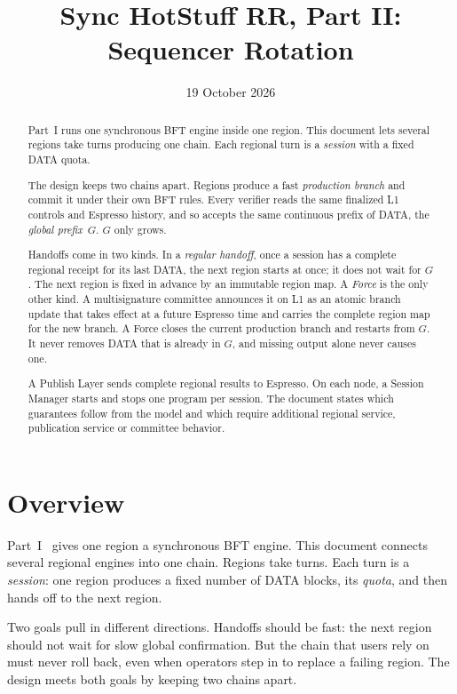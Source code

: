 \documentclass[11pt,a4paper]{article}
\title{Sync HotStuff RR, Part II: Sequencer Rotation}
\author{}\date{19 October 2026}
\newcommand{\defterm}[1]{\textcolor{rrBlue}{\textit{#1}}}
\begin{document}
\maketitle
\begin{abstract}
Part~I runs one synchronous BFT engine inside one region. This document
lets several regions take turns producing one chain. Each regional turn
is a \emph{session} with a fixed DATA quota.

The design keeps two chains apart. Regions produce a fast
\emph{production branch} and commit it under their own BFT rules.
Every verifier reads
the same finalized L1 controls and Espresso history, and so accepts the
same continuous prefix of DATA, the \emph{global prefix}~$G$. $G$ only
grows.

Handoffs come in two kinds. In a \emph{regular handoff}, once a session
has a complete regional receipt for its last DATA, the next region starts
at once; it does not wait for $G$. The next region is fixed in advance by
an immutable region map. A \emph{Force} is the only other kind. A
multisignature committee announces it on L1 as an atomic branch update
that takes effect at a future Espresso time and carries the complete
region map for the new branch. A Force closes the current production
branch and restarts from $G$. It never removes DATA that is already in
$G$, and missing output alone never causes one.

A Publish Layer sends complete regional results to Espresso. On each
node, a Session Manager starts and stops one program per session. The
document states which guarantees follow from the model and which
require additional regional service, publication service or committee
behavior.
\end{abstract}

\section{Overview}
\label{sec:overview}
Part~I~\cite{part1} gives one region a synchronous BFT engine.
This document connects several regional engines into one chain. Regions
take turns. Each turn is a \defterm{session}: one region produces a fixed
number of DATA blocks, its \emph{quota}, and then hands off to the next
region.

Two goals pull in different directions. Handoffs should be fast: the next
region should not wait for slow global confirmation. But the chain that
users rely on must never roll back, even when operators step in to
replace a failing region. The design meets both goals by keeping two
chains apart.
\end{document}
